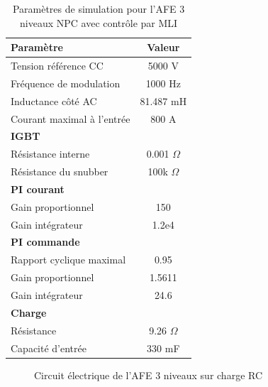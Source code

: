\begin{table}[htb]
\centering
\begin{tabular}{|l|c|} 
  \hline
  \textbf{Paramètre} & \textbf{Valeur}  \\
  \hline\hline
  Tension référence CC & 5000 V\\ \hline
  Fréquence de modulation & 1000 Hz \\ \hline
  Inductance côté AC& 81.487 mH\\ \hline
  Courant maximal à l'entrée& 800 A \\ \hline \hline
  \multicolumn{2}{|l|}{\textbf{IGBT}}\\ \hline
  Résistance interne & 0.001 $\Omega$\\
  Résistance du snubber & 100k $\Omega$\\ \hline \hline
   \multicolumn{2}{|l|}{\textbf{PI courant}}\\ \hline
  Gain proportionnel & 150 \\
  Gain intégrateur & 1.2e4 \\ \hline \hline
  \multicolumn{2}{|l|}{\textbf{PI commande}}\\ \hline
  Rapport cyclique maximal & 0.95\\
  Gain proportionnel & 1.5611 \\
  Gain intégrateur & 24.6 \\ \hline \hline
  \multicolumn{2}{|l|}{\textbf{Charge}}\\ \hline
  Résistance & 9.26 $\Omega$ \\
  Capacité d'entrée & 330 mF\\
  \hline
\end{tabular}
\caption{Paramètres de simulation pour l'AFE 3 niveaux NPC avec contrôle par MLI}
\label{p_AF_3level}
\end{table}

\begin{figure}[htb]
\caption{Circuit électrique de l'AFE 3 niveaux sur charge RC}
\label{circuit_AFE_3L_RC}
\end{figure}


